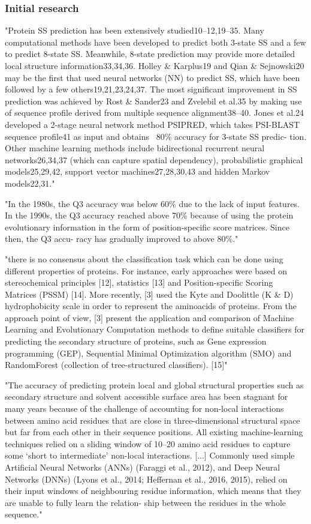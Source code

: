 	\subsubsection{Initial research}
	"Protein SS prediction has been extensively studied10–12,19–35. Many computational methods have been developed to predict both 3-state SS and a few to predict 8-state SS. Meanwhile, 8-state prediction may provide more detailed local structure information33,34,36. Holley \& Karplus19 and Qian \& Sejnowski20 may be the first that used neural networks (NN) to predict SS, which have been followed by a few others19,21,23,24,37. The most significant improvement in SS prediction was achieved by Rost \& Sander23 and Zvelebil et al.35 by making use of sequence profile derived from multiple sequence alignment38–40. Jones et al.24 developed a 2-stage neural network method PSIPRED, which takes PSI-BLAST sequence profile41 as input and obtains ~80\% accuracy for 3-state SS predic- tion. Other machine learning methods include bidirectional recurrent neural networks26,34,37 (which can capture spatial dependency), probabilistic graphical models25,29,42, support vector machines27,28,30,43 and hidden Markov models22,31." \cite{Wang2016}

	"In the 1980s, the Q3 accuracy was below 60\% due to the lack of input features. In the 1990s, the Q3 accuracy reached above 70\% because of using the protein evolutionary information in the form of position-specific score matrices. Since then, the Q3 accu- racy has gradually improved to above 80\%." \cite{Fang2017}

	"there is no consensus about the classification task which can be done using different properties of proteins. For instance, early approaches were based on stereochemical principles [12], statistics [13] and Position-specific Scoring Matrices (PSSM) [14]. More recently, [3] used the Kyte and Doolittle (K \& D) hydrophobicity scale in order to represent the aminoacids of proteins. From the approach point of view, [3] present the application and comparison of Machine Learning and Evolutionary Computation methods to define suitable classifiers for predicting the secondary structure of proteins, such as Gene expression programming (GEP), Sequential Minimal Optimization algorithm (SMO) and RandomForest (collection of tree-structured classifiers). [15]" \cite{Hattori2017}

	"The accuracy of predicting protein local and global structural properties such as secondary structure and solvent accessible surface area has been stagnant for many years because of the challenge of accounting for non-local interactions between amino acid residues that are close in three-dimensional structural space but far from each other in their sequence positions. All existing machine-learning techniques relied on a sliding window of 10–20 amino acid residues to capture some ‘short to intermediate’ non-local interactions. [...] Commonly used simple Artificial Neural Networks (ANNs) (Faraggi et al., 2012), and Deep Neural Networks (DNNs) (Lyons et al., 2014; Heffernan et al., 2016, 2015), relied on their input windows of neighbouring residue information, which means that they are unable to fully learn the relation- ship between the residues in the whole sequence." \cite{Heffernan2017}

